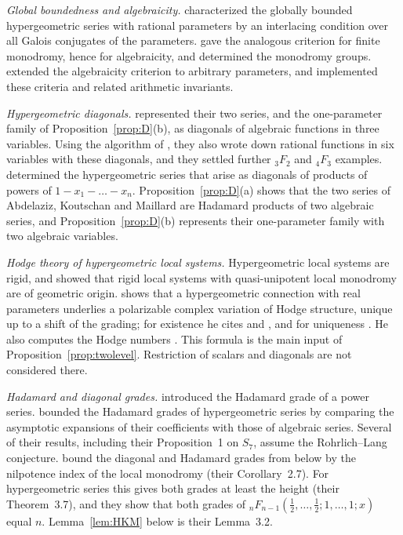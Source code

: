 \documentclass[11pt]{amsart}
\theoremstyle{definition}
\theoremstyle{remark}
\numberwithin{equation}{section}
\begin{document}
\emph{Global boundedness and algebraicity.} \citet{Christol1987} characterized the globally bounded hypergeometric series with rational parameters by an interlacing condition over all Galois conjugates of the parameters. \citet{BeukersHeckman1989} gave the analogous criterion for finite monodromy, hence for algebraicity, and determined the monodromy groups. \citet{FurnsinnYurkevich2024} extended the algebraicity criterion to arbitrary parameters, and \citet{CarusoFurnsinn2026a,CarusoFurnsinn2026b} implemented these criteria and related arithmetic invariants.

\emph{Hypergeometric diagonals.} \citet{AbdelazizKoutschanMaillard2020} represented their two series, and the one-parameter family of Proposition~\ref{prop:D}(b), as diagonals of algebraic functions in three variables. Using the algorithm of \citet{DenefLipshitz1987}, they also wrote down rational functions in six variables with these diagonals, and they settled further ${}_3F_2$ and ${}_4F_3$ examples. \citet{BostanYurkevich2022} determined the hypergeometric series that arise as diagonals of products of powers of $1-x_1-\dots-x_n$. Proposition~\ref{prop:D}(a) shows that the two series of Abdelaziz, Koutschan and Maillard are Hadamard products of two algebraic series, and Proposition~\ref{prop:D}(b) represents their one-parameter family with two algebraic variables.

\emph{Hodge theory of hypergeometric local systems.} Hypergeometric local systems are rigid, and \citet{Katz1996} showed that rigid local systems with quasi-unipotent local monodromy are of geometric origin. \citet[Proposition~2.6]{Fedorov2018} shows that a hypergeometric connection with real parameters underlies a polarizable complex variation of Hodge structure, unique up to a shift of the grading; for existence he cites \citet[Corollary~8.1]{Simpson1990} and \citet[Theorem~2.4.1]{DettweilerSabbah2013}, and for uniqueness \citet[Proposition~1.13(i)]{Deligne1987}. He also computes the Hodge numbers \citep[Theorem~1]{Fedorov2018}. This formula is the main input of Proposition~\ref{prop:twolevel}. Restriction of scalars and diagonals are not considered there.

\emph{Hadamard and diagonal grades.} \citet{AlloucheMendesFrance2011} introduced the Hadamard grade of a power series. \citet{RivoalRoques2014} bounded the Hadamard grades of hypergeometric series by comparing the asymptotic expansions of their coefficients with those of algebraic series. Several of their results, including their Proposition~1 on $S_7$, assume the Rohrlich--Lang conjecture. \citet{HarderKramerMiller2026} bound the diagonal and Hadamard grades from below by the nilpotence index of the local monodromy (their Corollary~2.7). For hypergeometric series this gives both grades at least the height (their Theorem~3.7), and they show that both grades of ${}_nF_{n-1}(\frac12,\dots,\frac12;1,\dots,1;x)$ equal $n$. Lemma~\ref{lem:HKM} below is their Lemma~3.2.
\end{document}
